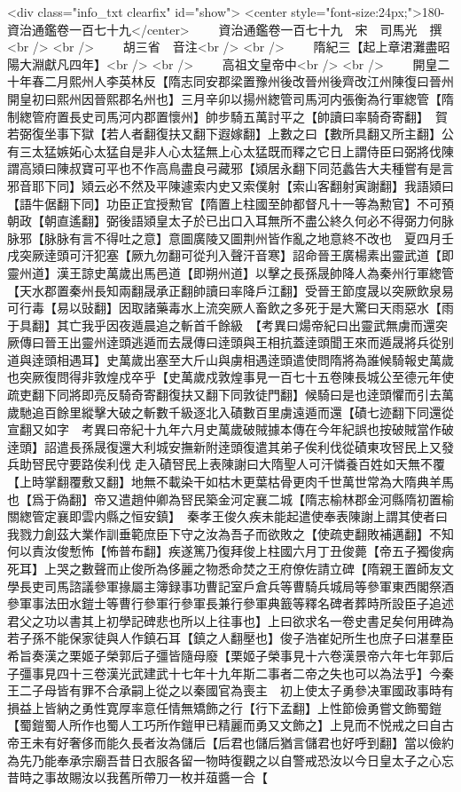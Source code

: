 <div class="info_txt clearfix" id="show">
<center style="font-size:24px;">180-資治通鑑卷一百七十九</center>
  　　資治通鑑卷一百七十九　宋　司馬光　撰<br />
<br />
　　胡三省　音注<br />
<br />
　　隋紀三【起上章涒灘盡昭陽大淵獻凡四年】<br />
<br />
　　高祖文皇帝中<br />
<br />
　　開皇二十年春二月熙州人李英林反【隋志同安郡梁置豫州後改晉州後齊改江州陳復曰晉州開皇初曰熙州因晉熙郡名州也】三月辛卯以揚州緫管司馬河内張衡為行軍緫管【隋制緫管府置長史司馬河内郡置懷州】帥步騎五萬討平之【帥讀曰率騎奇寄翻】　賀若弼復坐事下獄【若人者翻復扶又翻下遐嫁翻】上數之曰【數所具翻又所主翻】公有三太猛嫉妬心太猛自是非人心太猛無上心太猛既而釋之它日上謂侍臣曰弼將伐陳謂高熲曰陳叔寶可平也不作高鳥盡良弓藏邪【熲居永翻下同范蠡告大夫種嘗有是言邪音耶下同】熲云必不然及平陳遽索内史又索僕射【索山客翻射寅謝翻】我語熲曰【語牛倨翻下同】功臣正宜授勲官【隋置上柱國至帥都督凡十一等為勲官】不可預朝政【朝直遙翻】弼後語熲皇太子於已出口入耳無所不盡公終久何必不得弼力何脉脉邪【脉脉有言不得吐之意】意圖廣陵又圖荆州皆作亂之地意終不改也　夏四月壬戌突厥逹頭可汗犯塞【厥九勿翻可從刋入聲汗音寒】詔命晉王廣楊素出靈武道【即靈州道】漢王諒史萬歲出馬邑道【即朔州道】以擊之長孫晟帥降人為秦州行軍緫管【天水郡置秦州長知兩翻晟承正翻帥讀曰率降戶江翻】受晉王節度晟以突厥飲泉易可行毒【易以䜴翻】因取諸藥毒水上流突厥人畜飲之多死于是大驚曰天雨惡水【雨于具翻】其亡我乎因夜遁晨追之斬首千餘級　【考異曰煬帝紀曰出靈武無虜而還突厥傳曰晉王出靈州逹頭逃遁而去晟傳曰逹頭與王相抗蓋逹頭聞王來而遁晟將兵從别道與逹頭相遇耳】史萬歲出塞至大斤山與虜相遇逹頭遣使問隋將為誰候騎報史萬歲也突厥復問得非敦煌戍卒乎【史萬歲戍敦煌事見一百七十五卷陳長城公至德元年使疏吏翻下同將即亮反騎奇寄翻復扶又翻下同敦徒門翻】候騎曰是也逹頭懼而引去萬歲馳追百餘里縱擊大破之斬數千級逐北入磧數百里虜遠遁而還【磧七迹翻下同還從宣翻又如字　考異曰帝紀十九年六月史萬歲破賊據本傳在今年紀誤也按破賊當作破逹頭】詔遣長孫晟復還大利城安撫新附逹頭復遣其弟子俟利伐從磧東攻唘民上又發兵助唘民守要路俟利伐走入磧唘民上表陳謝曰大隋聖人可汗憐養百姓如天無不覆【上時掌翻覆敷又翻】地無不載染干如枯木更葉枯骨更肉千世萬世常為大隋典羊馬也【爲于偽翻】帝又遣趙仲卿為唘民築金河定襄二城【隋志榆林郡金河縣隋初置榆關緫管定襄即雲内縣之恒安鎮】　秦孝王俊久疾未能起遣使奉表陳謝上謂其使者曰我戮力創茲大業作訓垂範庶臣下守之汝為吾子而欲敗之【使疏吏翻敗補邁翻】不知何以責汝俊慙怖【怖普布翻】疾遂篤乃復拜俊上柱國六月丁丑俊薨【帝五子獨俊病死耳】上哭之數聲而止俊所為侈麗之物悉命焚之王府僚佐請立碑【隋親王置師友文學長吏司馬諮議參軍掾屬主簿録事功曹記室戶倉兵等曹騎兵城局等參軍東西閣祭酒參軍事法田水鎧士等曹行參軍行參軍長兼行參軍典籖等釋名碑者葬時所設臣子追述君父之功以書其上初學記碑悲也所以上往事也】上曰欲求名一卷史書足矣何用碑為若子孫不能保家徒與人作鎮石耳【鎮之人翻壓也】俊子浩崔妃所生也庶子曰湛羣臣希旨奏漢之栗姬子榮郭后子彊皆隨母廢【栗姬子榮事見十六卷漢景帝六年七年郭后子彊事見四十三卷漢光武建武十七年十九年斯二事者二帝之失也可以為法乎】今秦王二子母皆有罪不合承嗣上從之以秦國官為喪主　初上使太子勇參决軍國政事時有損益上皆納之勇性寛厚率意任情無矯飾之行【行下孟翻】上性節儉勇嘗文飾蜀鎧【蜀鎧蜀人所作也蜀人工巧所作鎧甲已精麗而勇又文飾之】上見而不悦戒之曰自古帝王未有好奢侈而能久長者汝為儲后【后君也儲后猶言儲君也好呼到翻】當以儉約為先乃能奉承宗廟吾昔日衣服各留一物時復觀之以自警戒恐汝以今日皇太子之心忘昔時之事故賜汝以我舊所帶刀一枚并葅醬一合【